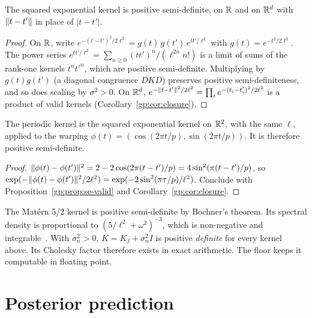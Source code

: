 \begin{proposition}\label{gp:prop:se-valid}
The squared exponential kernel is positive semi-definite, on $\mathbb{R}$ and on $\mathbb{R}^d$ with
$\lVert t-t'\rVert$ in place of $|t-t'|$.
\end{proposition}
\begin{proof}
On $\mathbb{R}$, write
$e^{-(t-t')^2/2\ell^2} = g(t)\,g(t')\,e^{tt'/\ell^2}$ with $g(t)=e^{-t^2/2\ell^2}$. The
power series $e^{tt'/\ell^2}=\sum_{n\ge0}(tt')^n/(\ell^{2n}n!)$ is a limit of sums of
the rank-one kernels $t^nt'^n$, which are positive semi-definite. Multiplying by
$g(t)g(t')$ (a diagonal congruence $DKD$) preserves positive semi-definiteness, and so does scaling by $\sigma^2>0$. On
$\mathbb{R}^d$, $e^{-\lVert t-t'\rVert^2/2\ell^2}=\prod_{i}e^{-(t_i-t_i')^2/2\ell^2}$ is a product of
valid kernels (Corollary~\ref{gp:cor:closure}).
\end{proof}

\begin{proposition}\label{gp:prop:periodic-valid}
The periodic kernel is the squared exponential kernel on $\mathbb{R}^2$, with the same $\ell$, applied
to the warping $\phi(t)=(\cos(2\pi t/p),\sin(2\pi t/p))$. It is therefore positive semi-definite.
\end{proposition}
\begin{proof}
$\lVert \phi(t)-\phi(t')\rVert^2 = 2-2\cos(2\pi(t-t')/p) = 4\sin^2(\pi(t-t')/p)$, so
$\exp(-\lVert \phi(t)-\phi(t')\rVert^2/2\ell^2)=\exp(-2\sin^2(\pi\tau/p)/\ell^2)$. Conclude with
Proposition~\ref{gp:prop:se-valid} and Corollary~\ref{gp:cor:closure}.
\end{proof}

The Matérn 5/2 kernel is positive semi-definite by Bochner's theorem. Its spectral
density is proportional to $(5/\ell^2+\omega^2)^{-3}$, which is non-negative and
integrable~\cite{rasmussen2006}. With $\sigma_n^2>0$, $K=K_f+\sigma_n^2I$ is positive
\emph{definite} for every kernel above. Its Cholesky factor therefore exists in exact
arithmetic. The floor  keeps it computable in floating
point.

\section{Posterior prediction}

